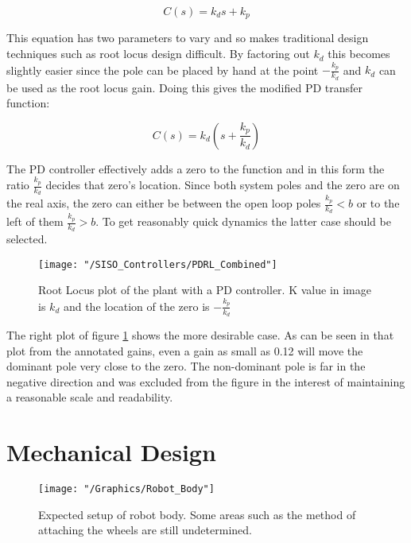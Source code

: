 \documentclass{article}
\begin{document}
	\begin{equation}
		\label{eqn:PDController}
		C(s) = k_d s + k_p
	\end{equation}
	
	This equation has two parameters to vary and so makes traditional design techniques such as root locus design difficult. By factoring out $k_d$ this becomes slightly easier since the pole can be placed by hand at the point $-\frac{k_p}{k_d}$ and $k_d$ can be used as the root locus gain. Doing this gives the modified PD transfer function:
	
	\begin{equation}
		\label{eqn:PDModified}
		C(s) = k_d (s + \frac{k_p}{k_d})
	\end{equation}
	
	The PD controller effectively adds a zero to the function and in this form the ratio $\frac{k_p}{k_d}$ decides that zero's location. Since both system poles and the zero are on the real axis, the zero can either be between the open loop poles $\frac{k_p}{k_d} < b$ or to the left of them $\frac{k_p}{k_d} > b$. To get reasonably quick dynamics the latter case should be selected. 
	
	\begin{figure}[h]
		\centerline{\texttt{[image: "/SISO\_Controllers/PDRL\_Combined"]}}
		\caption{Root Locus plot of the plant with a PD controller. K value in image is $k_d$ and the location of the zero is $-\frac{k_p}{k_d}$}
		\label{fig:PDRootLocus}
	\end{figure}
	
	The right plot of figure \ref{fig:PDRootLocus} shows the more desirable case. As can be seen in that plot from the annotated gains, even a gain as small as 0.12 will move the dominant pole very close to the zero. The non-dominant pole is far in the negative direction and was excluded from the figure in the interest of maintaining a reasonable scale and readability.

\section{Mechanical Design}

	\begin{figure}[h]
		\centerline{\texttt{[image: "/Graphics/Robot\_Body"]}}
		\caption{Expected setup of robot body. Some areas such as the method of attaching the wheels are still undetermined.}		
		\label{fig:RobotBodyGraphic}
	\end{figure}
\end{document}
